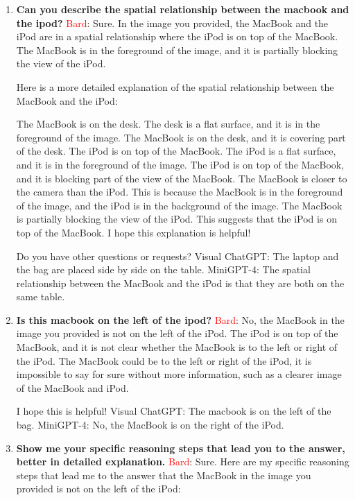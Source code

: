 \begin{enumerate}
    \item \textbf{Can you describe the spatial relationship between the macbook and the ipod?}
    \subitem \textcolor{Red}{Bard}: 
    Sure. In the image you provided, the MacBook and the iPod are in a spatial relationship where the iPod is on top of the MacBook. The MacBook is in the foreground of the image, and it is partially blocking the view of the iPod.
    
    Here is a more detailed explanation of the spatial relationship between the MacBook and the iPod:
    
    The MacBook is on the desk. The desk is a flat surface, and it is in the foreground of the image. The MacBook is on the desk, and it is covering part of the desk.
    The iPod is on top of the MacBook. The iPod is a flat surface, and it is in the foreground of the image. The iPod is on top of the MacBook, and it is blocking part of the view of the MacBook.
    The MacBook is closer to the camera than the iPod. This is because the MacBook is in the foreground of the image, and the iPod is in the background of the image.
    The MacBook is partially blocking the view of the iPod. This suggests that the iPod is on top of the MacBook.
    I hope this explanation is helpful!
    
    Do you have other questions or requests?
    \subitem Visual ChatGPT: The laptop and the bag are placed side by side on the table.
    \subitem MiniGPT-4: The spatial relationship between the MacBook and the iPod is that they are both on the same table.
    \item \textbf{Is this macbook on the left of the ipod?}
    \subitem \textcolor{Red}{Bard}: 
    No, the MacBook in the image you provided is not on the left of the iPod. The iPod is on top of the MacBook, and it is not clear whether the MacBook is to the left or right of the iPod. The MacBook could be to the left or right of the iPod, it is impossible to say for sure without more information, such as a clearer image of the MacBook and iPod.

    I hope this is helpful!
    \subitem Visual ChatGPT: The macbook is on the left of the bag.
    \subitem MiniGPT-4: No, the MacBook is on the right of the iPod.
    \item \textbf{Show me your specific reasoning steps that lead you to the answer, better in detailed explanation.}
    \subitem \textcolor{Red}{Bard}: 
    Sure. Here are my specific reasoning steps that lead me to the answer that the MacBook in the image you provided is not on the left of the iPod:
    

\end{enumerate}

